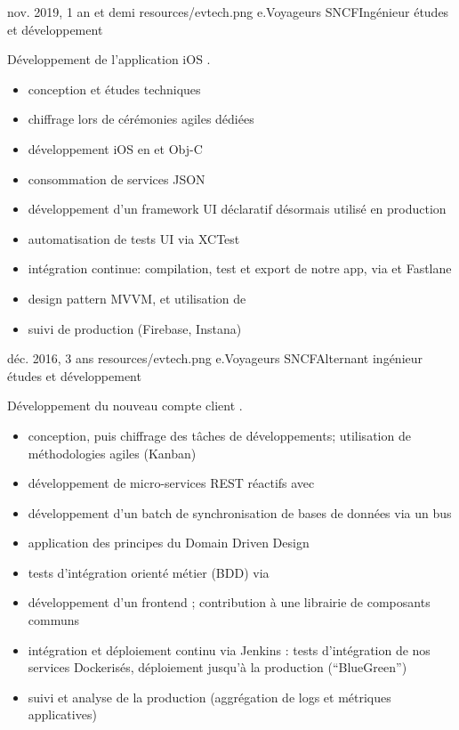 \documentclass{cv}
\begin{document}
\experience
{{nov. 2019,  1 an et demi}}
{resources/evtech.png}
{e.Voyageurs SNCF}{Ingénieur études et développement}{

Développement de l'application iOS \href{https://apps.apple.com/fr/app/oui-sncf-train-et-bus/id343889987}{\link{\ouisncf{}}}.

\begin{itemize}
	\item conception et études techniques
	\item chiffrage lors de cérémonies agiles dédiées
	\item développement iOS  en  et Obj-C
	\item consommation de services JSON
	\item développement d'un framework UI déclaratif désormais utilisé en production
	\item automatisation de tests UI via XCTest
	\item intégration continue: compilation, test et export de notre app, via  et Fastlane
	\item design pattern MVVM, et utilisation de 
	\item suivi de production (Firebase, Instana)
\end{itemize}
}

\experience
{{déc. 2016,  3 ans}}
{resources/evtech.png}
{e.Voyageurs SNCF}{Alternant ingénieur études et développement}{

Développement du nouveau compte client \ouisncf{}. 

\begin{itemize}
	\item conception, puis chiffrage des tâches de développements; utilisation de méthodologies agiles (Kanban)
	\item développement de micro-services REST réactifs avec 
	\item développement d'un batch de synchronisation de bases de données via un bus 
	\item application des principes du Domain Driven Design
	\item tests d'intégration orienté métier (BDD) via 
	\item développement d'un frontend ; contribution à une librairie de composants communs
	\item intégration et déploiement continu via Jenkins : tests d'intégration de nos services Dockerisés, 
	déploiement jusqu'à la production (``BlueGreen'')
	\item suivi et analyse de la production (aggrégation de logs et métriques applicatives)
\end{itemize}
}
\end{document}
